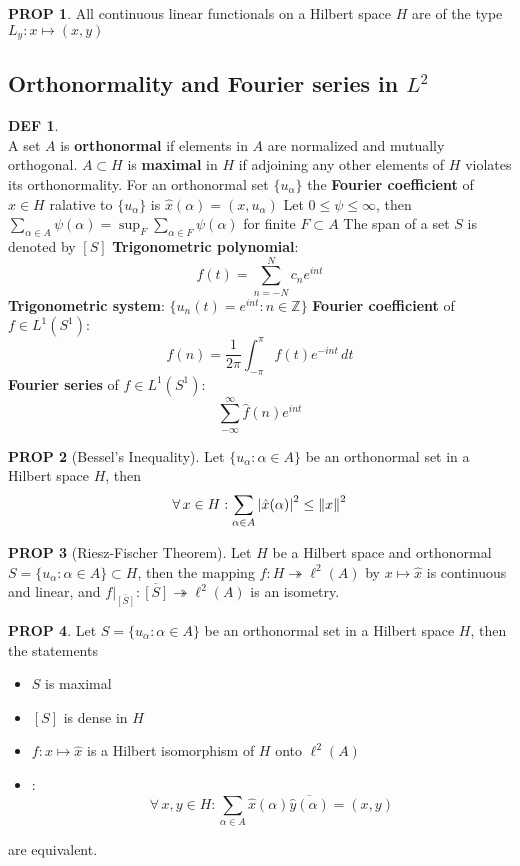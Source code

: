 \documentclass[hidelinks,10pt]{article}
\theoremstyle{definition}
\newtheorem*{defin}{DEF}
\theoremstyle{dotles}
\theoremstyle{dotless}
\newtheorem{proposition}{PROP}[section]
\theoremstyle{remark}
\begin{document}
\begin{proposition}
All continuous linear functionals on a Hilbert space $H$ are of the type $L_y:x\mapsto(x,y)$
\end{proposition}

\subsection{Orthonormality and Fourier series in $L^2$}

\begin{defin}~\\
A set $A$ is \textbf{orthonormal} if elements in $A$ are normalized and mutually orthogonal. $A\subset H$ is \textbf{maximal} in $H$ if adjoining any other elements of $H$ violates its orthonormality.\newline
For an orthonormal set $\{u_\alpha\}$ the \textbf{Fourier coefficient} of $x\in H$ ralative to $\{u_\alpha\}$ is $\hat{x}(\alpha)=(x,u_\alpha)$\bigbreak
Let $0\leq\psi\leq\infty$, then $\sum_{\alpha\in A}\psi(\alpha)=\sup_F\sum_{\alpha\in F}\psi(\alpha)$ for finite $F\subset A$\newline
The span of a set $S$ is denoted by $[S]$\bigbreak
\textbf{Trigonometric polynomial}:
\[f(t)=\sum_{n=-N}^Nc_ne^{int}\]\newline
\textbf{Trigonometric system}: $\{u_n(t)=e^{int}:n\in\mathbb{Z}\}$\newline
\textbf{Fourier coefficient} of $f\in L^1(S^1)$:
\[\hat{f}(n)=\frac{1}{2\pi}\int_{-\pi}^\pi f(t)e^{-int}\,dt\]
\textbf{Fourier series} of $f\in L^1(S^1)$:
\[\sum_{-\infty}^\infty\hat{f}(n)e^{int}\]
\end{defin}

\begin{proposition}[Bessel's Inequality]Let $\{u_\alpha:\alpha\in A\}$ be an orthonormal set in a Hilbert space $H$, then
\[\forall\,x\in H:\sum_{\alpha\in A}\abs{\hat{x}(\alpha)}^2\leq\norm{x}^2\]
\end{proposition}

\begin{proposition}[Riesz-Fischer Theorem]Let $H$ be a Hilbert space and orthonormal $S=\{u_\alpha:\alpha\in A\}\subset H$, then the mapping $f:H\twoheadrightarrow\ell^2(A)$ by $x\mapsto \hat{x}$ is continuous and linear, and $f|_{\overline{[S]}}:\overline{[S]}\twoheadrightarrow\ell^2(A)$ is an isometry.
\end{proposition}

\begin{proposition}
Let $S=\{u_\alpha:\alpha\in A\}$ be an orthonormal set in a Hilbert space $H$, then the statements\begin{itemize}
    \item $S$ is maximal
    \item $[S]$ is dense in $H$
    \item $f:x\mapsto\hat{x}$ is a Hilbert isomorphism of $H$ onto $\ell^2(A)$
    \item {}:
    \[\forall\,x,y\in H:\sum_{\alpha\in A}\hat{x}(\alpha)\overline{\hat{y}(\alpha)}=(x,y)\]
\end{itemize}
are equivalent.
\end{proposition}
\end{document}
